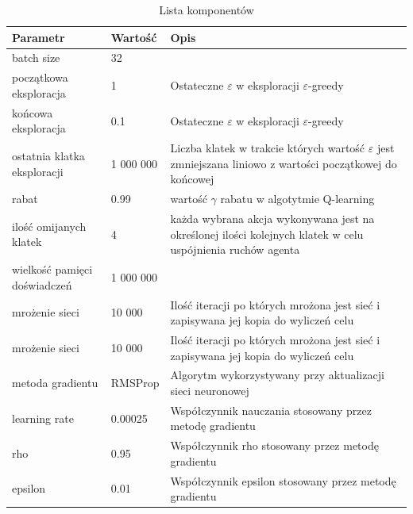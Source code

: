 \documentclass[12pt]{article}
\begin{document}
\begin{center}

\begin{table}[H]
  \centering%
  \caption{Lista komponentów}
\begin{tabular}{|p{3cm}|p{3cm}|p{10cm}|}
\hline
\textbf{Parametr} & \textbf{Wartość} & \textbf{Opis} \\
\hline

batch size &
32 & 
 \\
\hline

początkowa eksploracja &
1 &
Ostateczne $\varepsilon$ w eksploracji $\varepsilon$-greedy \\
\hline

końcowa eksploracja &
0.1 &
Ostateczne $\varepsilon$ w eksploracji $\varepsilon$-greedy \\
\hline

ostatnia klatka eksploracji &
1 000 000 &
Liczba klatek w trakcie których wartość $\varepsilon$ jest zmniejszana liniowo z wartości początkowej do końcowej\\
\hline

rabat &
0.99 &
wartość $\gamma$ rabatu w algotytmie Q-learning\\
\hline

ilość omijanych klatek &
4 &
każda wybrana akcja wykonywana jest na określonej ilości kolejnych klatek w celu uspójnienia ruchów agenta \\
\hline

wielkość pamięci doświadczeń &
1 000 000 &
\\
\hline

mrożenie sieci &
10 000 &
Ilość iteracji po których mrożona jest sieć i zapisywana jej kopia do wyliczeń celu  \\
\hline

mrożenie sieci &
10 000 &
Ilość iteracji po których mrożona jest sieć i zapisywana jej kopia do wyliczeń celu  \\
\hline


metoda gradientu &
RMSProp &
Algorytm wykorzystywany przy aktualizacji sieci neuronowej  \\
\hline

learning rate &
0.00025 &
Współczynnik nauczania stosowany przez metodę gradientu  \\
\hline

rho &
0.95 &
Współczynnik rho stosowany przez metodę gradientu  \\
\hline

epsilon &
0.01&
Współczynnik epsilon stosowany przez metodę gradientu  \\
\hline

\end{tabular}
\end{table}
\end{center}
\end{document}
